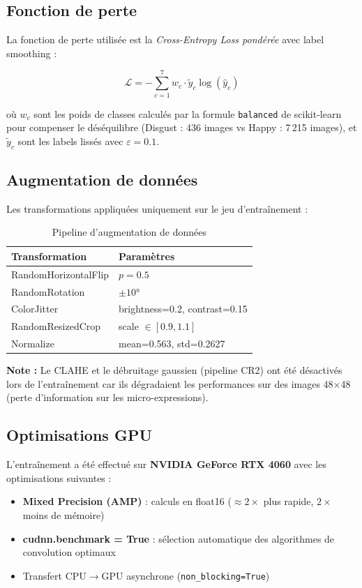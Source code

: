 \documentclass[12pt,a4paper]{article}
\begin{document}
\subsection{Fonction de perte}

La fonction de perte utilisée est la \textit{Cross-Entropy Loss pondérée} avec label smoothing :

\[
\mathcal{L} = -\sum_{c=1}^{7} w_c \cdot \tilde{y}_c \log(\hat{y}_c)
\]

où $w_c$ sont les poids de classes calculés par la formule \texttt{balanced} de scikit-learn pour compenser le déséquilibre (Disgust : 436 images vs Happy : 7\,215 images), et $\tilde{y}_c$ sont les labels lissés avec $\varepsilon = 0.1$.

\subsection{Augmentation de données}

Les transformations appliquées uniquement sur le jeu d'entraînement :

\begin{table}[H]
\centering
\caption{Pipeline d'augmentation de données}
\begin{tabular}{ll}
\toprule
\textbf{Transformation} & \textbf{Paramètres} \\
\midrule
RandomHorizontalFlip    & $p = 0.5$ \\
RandomRotation          & $\pm 10°$ \\
ColorJitter             & brightness=0.2, contrast=0.15 \\
RandomResizedCrop       & scale $\in [0.9, 1.1]$ \\
Normalize               & mean=0.563, std=0.2627 \\
\bottomrule
\end{tabular}
\end{table}

\textbf{Note :} Le CLAHE et le débruitage gaussien (pipeline CR2) ont été désactivés lors de l'entraînement car ils dégradaient les performances sur des images 48$\times$48 (perte d'information sur les micro-expressions).

\subsection{Optimisations GPU}

L'entraînement a été effectué sur \textbf{NVIDIA GeForce RTX 4060} avec les optimisations suivantes :
\begin{itemize}
    \item \textbf{Mixed Precision (AMP)} : calculs en float16 ($\approx 2\times$ plus rapide, $2\times$ moins de mémoire)
    \item \textbf{cudnn.benchmark = True} : sélection automatique des algorithmes de convolution optimaux
    \item Transfert CPU$\rightarrow$GPU asynchrone (\texttt{non\_blocking=True})
\end{itemize}
\end{document}
